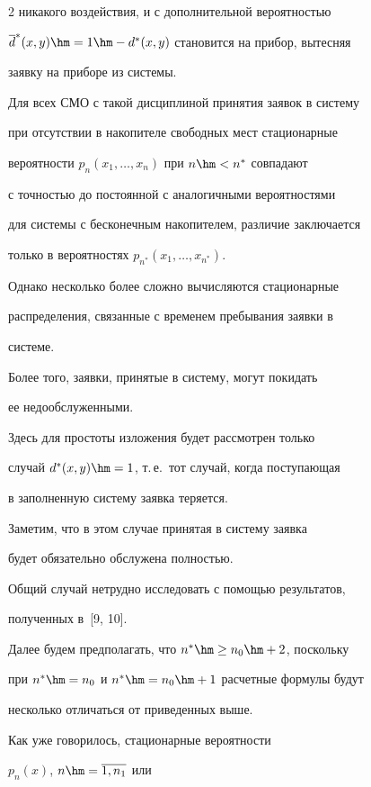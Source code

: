 \begin{multicols}{2}
никакого воздействия, и с дополнительной вероятностью


$\d^*(x,y)\hm=1\hm-d^*(x,y)$ становит\-ся на прибор, вытесняя


заявку на приборе из сис\-те\-мы.


Для всех СМО с такой дисциплиной принятия заявок в сис\-те\-му


при отсутствии в накопителе свободных мест стационарные


вероятности $p_n(x_1,\ldots,x_n)$ при $n\hm<n^*$ совпадают


с точ\-ностью до постоянной с аналогичными вероятностями


для сис\-те\-мы с бесконечным накопителем, различие заключается


только в вероятностях $p_{n^*}(x_1,\ldots,x_{n^*})$.


Однако несколько более сложно вычисляются стационарные


распределения, связанные с временем пребывания заявки в


системе.


Более того, заявки, принятые в систему, могут покидать


ее недообслуженными.





Здесь для простоты изложения будет рассмотрен только


случай $d^*(x,y)\hm=1$, т.\,е.\ тот случай, когда поступающая


в заполненную систему заявка теряется.


Заметим, что в этом случае принятая в систему заявка


будет обязательно обслужена полностью.


Общий случай нетрудно исследовать с помощью результатов,


полученных в~[9, 10].





Далее будем предполагать, что $n^*\hm\ge n_0 \hm+ 2$, поскольку


при $n^*\hm=n_0$ и $n^*\hm=n_0 \hm+ 1$ расчетные формулы будут


несколько отличаться от приведенных выше.





Как уже говорилось, стационарные вероятности


$p_n(x)$, $n\hm=\overline{1,n_1}$ или



\end{multicols}
